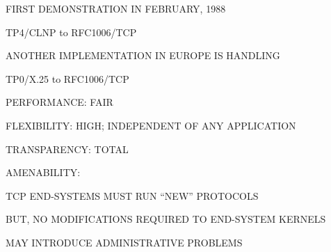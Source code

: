 \begin{bwslide}

\begin{nrtc}
\item	FIRST DEMONSTRATION IN FEBRUARY, 1988
    \begin{nrtc}
    \item	TP4/CLNP to RFC1006/TCP
    \end{nrtc}

\item	ANOTHER IMPLEMENTATION IN EUROPE IS HANDLING
    \begin{nrtc}
    \item	TP0/X.25 to RFC1006/TCP
    \end{nrtc}
\end{nrtc}
\end{bwslide}


\begin{bwslide}

\begin{nrtc}
\item	PERFORMANCE: FAIR

\item	FLEXIBILITY: HIGH; INDEPENDENT OF ANY APPLICATION

\item	TRANSPARENCY: TOTAL

\item	AMENABILITY:
    \begin{nrtc}
    \item	TCP END-SYSTEMS MUST RUN ``NEW'' PROTOCOLS
	\begin{nrtc}
	\item	BUT, NO MODIFICATIONS REQUIRED TO END-SYSTEM KERNELS
	\end{nrtc}

    \item	MAY INTRODUCE ADMINISTRATIVE PROBLEMS
    \end{nrtc}
\end{nrtc}
\end{bwslide}


